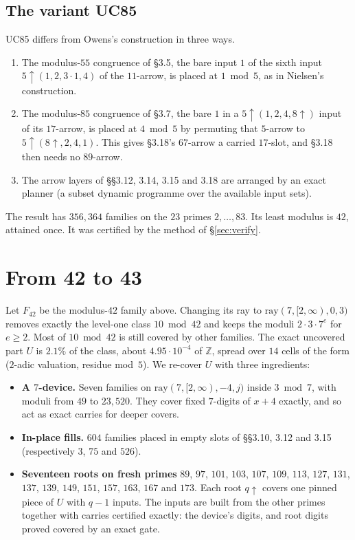 \documentclass[11pt]{amsart}
\theoremstyle{definition}
\theoremstyle{remark}
\newcommand{\Z}{\mathbb{Z}}
\newcommand{\up}{{\uparrow}}
\begin{document}
\subsection*{The variant UC85}
UC85 differs from Owens's construction \cite{Owens14} in three ways.
\begin{enumerate}
\item The modulus-$55$ congruence of §3.5, the bare input $1$ of the sixth input $5\up(1,2,3\cdot1,4)$ of the
  $11$-arrow, is placed at $1 \bmod 5$, as in Nielsen's construction.
\item The modulus-$85$ congruence of §3.7, the bare $1$ in a $5\up(1,2,4,8\up)$ input of its $17$-arrow, is placed at
  $4 \bmod 5$ by permuting that $5$-arrow to $5\up(8\up,2,4,1)$. This gives §3.18's $67$-arrow a carried
  $17$-slot, and §3.18 then needs no $89$-arrow.
\item The arrow layers of §§3.12, 3.14, 3.15 and 3.18 are arranged by an exact planner (a subset dynamic
  programme over the available input sets).
\end{enumerate}
The result has $356{,}364$ families on the $23$ primes $2,\dots,83$. Its least modulus is $42$, attained once. It was
certified by the method of §\ref{sec:verify}.

\section{From 42 to 43}\label{sec:43}

Let $F_{42}$ be the modulus-$42$ family above. Changing its ray to $\mathrm{ray}(7,[2,\infty),0,3)$ removes exactly the
level-one class $10 \bmod 42$ and keeps the moduli $2\cdot3\cdot7^e$ for $e\ge2$. Most of $10 \bmod 42$ is still
covered by other families. The exact uncovered part $U$ is $2.1\%$ of the class, about $4.95\cdot10^{-4}$ of $\Z$,
spread over $14$ cells of the form ($2$-adic valuation, residue mod~$5$). We re-cover $U$ with three ingredients:

\begin{itemize}
\item \textbf{A $7$-device.} Seven families on $\mathrm{ray}(7,[2,\infty),-4,j)$ inside $3 \bmod 7$, with moduli
  from $49$ to $23{,}520$. They cover fixed $7$-digits of $x+4$ exactly, and so act as exact carries for deeper
  covers.
\item \textbf{In-place fills.} $604$ families placed in empty slots of §§3.10, 3.12 and 3.15 (respectively $3$,
  $75$ and $526$).
\item \textbf{Seventeen roots on fresh primes} $89$, $97$, $101$, $103$, $107$, $109$, $113$, $127$, $131$, $137$, $139$,
  $149$, $151$, $157$, $163$, $167$ and $173$. Each root $q\up$ covers one pinned piece of $U$ with $q-1$ inputs. The inputs are built from the
  other primes together with carries certified exactly: the device's digits, and root digits proved covered by an
  exact gate.
\end{itemize}
\end{document}
